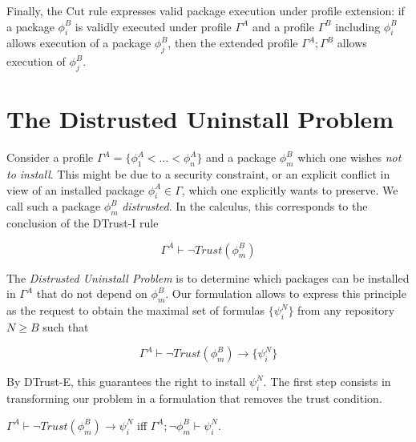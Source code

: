 \documentclass[]{llncs}
\begin{document}
Finally, the Cut rule expresses valid package execution under profile extension: if a package $\phi^{B}_{i}$ is validly executed under profile $\Gamma^{A}$ and a profile $\Gamma^{B}$ including $\phi^{B}_{i}$ allows execution of a package $\phi^{B}_{j}$, then the extended profile $\Gamma^{A}; \Gamma^{B}$ allows execution of $\phi^{B}_{j}$.


\section{The Distrusted Uninstall Problem}\label{sec:distrusted}


Consider a profile $\Gamma^{A}=\{\phi_{1}^{A}< \dots< \phi_{n}^{A}\}$ and a package $\phi_{m}^{B}$ which one wishes \textit{not to install}. This might be due to a security constraint, or an explicit conflict in view of an installed package $\phi^{A}_{i}\in \Gamma$, which one explicitly wants to preserve. We call such a package $\phi_{m}^{B}$ \textit{distrusted}. In the calculus, this corresponds to the conclusion of the DTrust-I rule

$$\Gamma^{A}\vdash \neg Trust(\phi_{m}^{B})$$

The \textit{Distrusted Uninstall Problem} is to determine which packages can be installed in $\Gamma^{A}$ that do not depend on $\phi_{m}^{B}$. Our formulation allows to express this principle as the request to obtain the maximal set of formulas $\{\psi_{i}^{N}\}$ from any repository $N\geq B$ such that

$$\Gamma^{A}\vdash \neg Trust(\phi_{m}^{B})\rightarrow \{\psi_{i}^{N}\}$$

By DTrust-E, this guarantees the right to install $\psi_{i}^{N}$. The first step consists in transforming our problem in a formulation that removes the trust condition.

\begin{lemma}
	$\Gamma^{A}\vdash \neg Trust(\phi_{m}^{B})\rightarrow \psi_{i}^{N}$ iff $\Gamma^{A}; \neg \phi_{m}^{B}\vdash \psi_{i}^{N}$.
\end{lemma}
\end{document}
